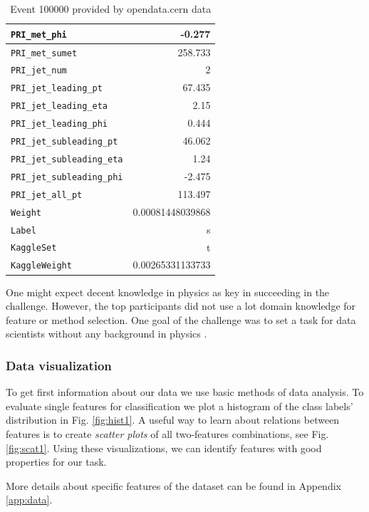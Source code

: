 \begin{table}
\begin{center}
\begin{tabular}{|l|r|}
		\hline
		\texttt{PRI\_met\_phi} & -0.277 \\
		\hline
		\texttt{PRI\_met\_sumet} & 258.733 \\
		\hline
		\texttt{PRI\_jet\_num} & 2 \\
		\hline
		\texttt{PRI\_jet\_leading\_pt} & 67.435 \\
		\hline
		\texttt{PRI\_jet\_leading\_eta} & 2.15 \\
		\hline
		\texttt{PRI\_jet\_leading\_phi} & 0.444 \\
		\hline
		\texttt{PRI\_jet\_subleading\_pt} & 46.062 \\
		\hline
		\texttt{PRI\_jet\_subleading\_eta} & 1.24 \\
		\hline
		\texttt{PRI\_jet\_subleading\_phi} & -2.475 \\
		\hline
		\texttt{PRI\_jet\_all\_pt} & 113.497 \\
		\hline
		\texttt{Weight} & 0.00081448039868 \\
		\hline
		\texttt{Label} & s \\
		\hline
		\texttt{KaggleSet} & t \\
		\hline
		\texttt{KaggleWeight} & 0.00265331133733 \\
		\hline	
	\end{tabular}
\end{center}
\caption{Event 100000 provided by opendata.cern data \cite{higgsData}}
\label{tab:data}
\end{table}

One might expect decent knowledge in physics as key in succeeding in the challenge. However, the top participants did not use a lot domain knowledge for feature or method selection. One goal of the challenge was to set a task for data scientists without any background in physics \cite{higgsPaper}.

\subsubsection{Data visualization}
To get first information about our data we use basic methods of data analysis.
To evaluate single features for classification we plot a histogram of the class labels' distribution in Fig. \ref{fig:hist1}. A useful way to learn about relations between features is to create \emph{scatter plots} of all two-features combinations, see Fig. \ref{fig:scat1}.
Using these visualizations, we can identify features with good properties for our task.

More details about specific features of the dataset can be found in Appendix \ref{app:data}.

